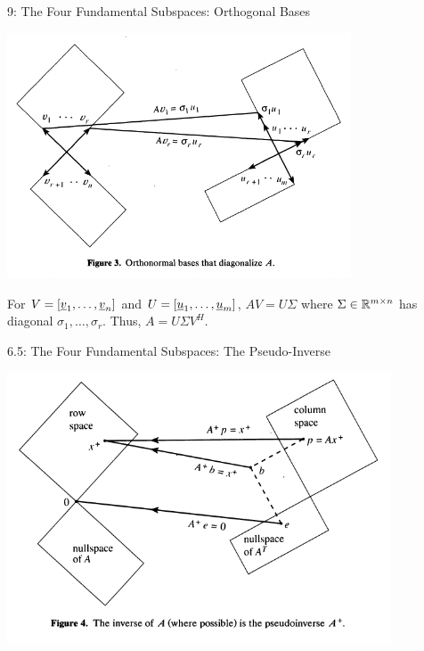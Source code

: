 \documentclass[10pt,letterpaper,english]{beamer}
\begin{document}
\begin{frame}{9: The Four Fundamental Subspaces: Orthogonal Bases}

\vspace{-1mm}
\hspace*{-1mm}
\includegraphics[width=102mm]{strang_fig3}

\vspace{-3mm}
For $V = [\underline{v}_1,\ldots,\underline{v}_n]
$ and $U = [\underline{u}_1,\ldots,\underline{u}_m]$, $A V = U \Sigma$ where $\Sigma \in \mathbb{R}^{m \times n}$ has diagonal $\sigma_1,\ldots,\sigma_r$.  Thus, $A = U \Sigma V^H$.


\let\thefootnote\relax\footnotetext{\hspace*{-4mm} {\tiny Figure from ``The Fundamental Theorem of Linear Algebra'' by Gilbert Strang, The American Mathematical Monthly, Nov. 1993 }}

\end{frame}

\begin{frame}{6.5: The Four Fundamental Subspaces: The Pseudo-Inverse}

\hspace*{-4mm}
\includegraphics[width=114mm]{strang_fig4}

\let\thefootnote\relax\footnotetext{\hspace*{-4mm} {\tiny Figure from ``The Fundamental Theorem of Linear Algebra'' by Gilbert Strang, The American Mathematical Monthly, Nov. 1993 }}

\end{frame}
\end{document}
